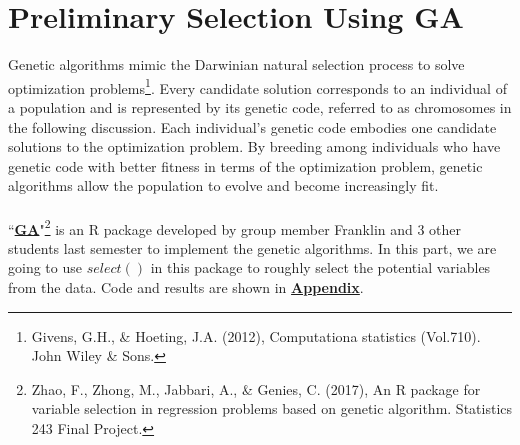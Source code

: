 \documentclass[12pt]{article}
\begin{document}
	\section{Preliminary Selection Using GA}
	Genetic algorithms mimic the Darwinian natural selection process to solve optimization problems\footnote{Givens, G.H., \& Hoeting, J.A. (2012), Computationa statistics (Vol.710). John Wiley \& Sons.}. Every candidate solution corresponds to an individual of a population and is represented by its genetic code, referred to as chromosomes in the following discussion. Each individual's genetic code embodies one candidate solutions to the optimization problem. By breeding among individuals who have genetic code with better fitness in terms of the optimization problem, genetic algorithms allow the population to evolve and become increasingly fit.\\\\
	``\href{https://github.com/QinganZhao/GA}{\textbf{GA}}"\footnote{Zhao, F., Zhong, M., Jabbari, A., \& Genies, C. (2017), An R package for variable selection in regression problems based on genetic algorithm. Statistics 243 Final Project.} is an R package developed by group member Franklin and 3 other students last semester to implement the genetic algorithms. In this part, we are going to use $select()$ in this package to roughly select the potential variables from the data. Code and results are shown in \hyperref[code]{\textbf{Appendix}}.\\
\end{document}
